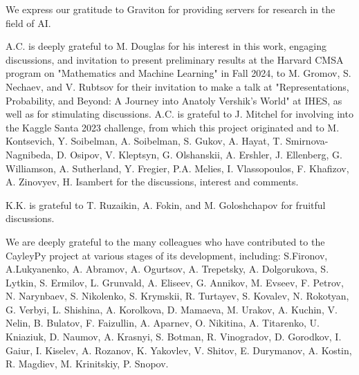 We express our gratitude to Graviton for providing servers for research in the field of AI. 

A.C. is deeply grateful to M. Douglas for his interest in this work, engaging discussions, and invitation to present preliminary results at the Harvard CMSA program on "Mathematics and Machine Learning" in Fall 2024, to M. Gromov, S. Nechaev, and V. Rubtsov for their invitation to make a talk at "Representations, Probability, and Beyond: A Journey into Anatoly Vershik’s World" at IHES, as well as for stimulating discussions. A.C. is grateful to J. Mitchel for involving  into the Kaggle Santa 2023 challenge, from which this project originated and to M. Kontsevich, Y. Soibelman, A. Soibelman, S. Gukov, A. Hayat, T. Smirnova-Nagnibeda,  D. Osipov, V. Kleptsyn, G. Olshanskii, A. Ershler, J. Ellenberg, G. Williamson, A. Sutherland,  Y. Fregier, P.A. Melies, I. Vlassopoulos, F. Khafizov, A. Zinovyev,  H. Isambert for the discussions, interest and comments. 

K.K. is grateful to T. Ruzaikin, A. Fokin, and M. Goloshchapov for fruitful discussions.

We are deeply grateful to the many colleagues who have contributed to the CayleyPy project at various stages of its development, including: S.Fironov, A.Lukyanenko, A. Abramov, A. Ogurtsov, A. Trepetsky, A. Dolgorukova, S. Lytkin, S. Ermilov, L. Grunvald, A. Eliseev, G. Annikov, M. Evseev, F. Petrov, N. Narynbaev, S. Nikolenko, S. Krymskii, R. Turtayev, S. Kovalev, N. Rokotyan, G. Verbyi, L. Shishina, A. Korolkova, D. Mamaeva, M. Urakov, A. Kuchin, V. Nelin, B. Bulatov,  F. Faizullin, A. Aparnev, O. Nikitina, A. Titarenko, U. Kniaziuk, D. Naumov, A. Krasnyi, S. Botman, R. Vinogradov, D. Gorodkov, I. Gaiur, I. Kiselev, A. Rozanov, K. Yakovlev, V. Shitov, E. Durymanov, A. Kostin, R. Magdiev, M. Krinitskiy, P. Snopov. 